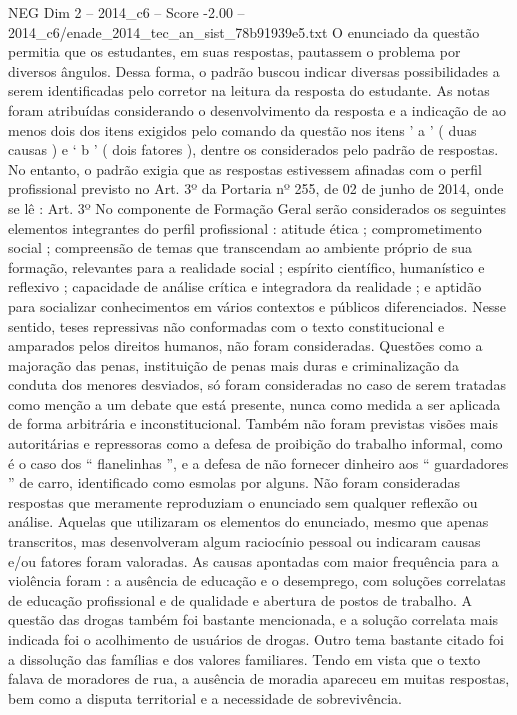 \begin{textsample}{NEG Dim 2 – 2014\_c6 – Score -2.00 – 2014\_c6/enade\_2014\_tec\_an\_sist\_78b91939e5.txt}
O enunciado da questão permitia que os estudantes, em suas respostas, pautassem o problema por diversos ângulos.
Dessa forma, o padrão buscou indicar diversas possibilidades a serem identificadas pelo corretor na leitura da resposta do estudante.
As notas foram atribuídas considerando o desenvolvimento da resposta e a indicação de ao menos dois dos itens exigidos pelo comando da questão nos itens ’ a ’ ( duas causas ) e ‘ b ’ ( dois fatores ), dentre os considerados pelo padrão de respostas.
No entanto, o padrão exigia que as respostas estivessem afinadas com o perfil profissional previsto no Art. 3º da Portaria nº 255, de 02 de junho de 2014, onde se lê : Art. 3º No componente de Formação Geral serão considerados os seguintes elementos integrantes do perfil profissional : atitude ética ; comprometimento social ; compreensão de temas que transcendam ao ambiente próprio de sua formação, relevantes para a realidade social ; espírito científico, humanístico e reflexivo ; capacidade de análise crítica e integradora da realidade ; e aptidão para socializar conhecimentos em vários contextos e públicos diferenciados.
Nesse sentido, teses repressivas não conformadas com o texto constitucional e amparados pelos direitos humanos, não foram consideradas.
Questões como a majoração das penas, instituição de penas mais duras e criminalização da conduta dos menores desviados, só foram consideradas no caso de serem tratadas como menção a um debate que está presente, nunca como medida a ser aplicada de forma arbitrária e inconstitucional.
Também não foram previstas visões mais autoritárias e repressoras como a defesa de proibição do trabalho informal, como é o caso dos “ flanelinhas ”, e a defesa de não fornecer dinheiro aos “ guardadores ” de carro, identificado como esmolas por alguns.
Não foram consideradas respostas que meramente reproduziam o enunciado sem qualquer reflexão ou análise.
Aquelas que utilizaram os elementos do enunciado, mesmo que apenas transcritos, mas desenvolveram algum raciocínio pessoal ou indicaram causas e/ou fatores foram valoradas.
As causas apontadas com maior frequência para a violência foram : a ausência de educação e o desemprego, com soluções correlatas de educação profissional e de qualidade e abertura de postos de trabalho.
A questão das drogas também foi bastante mencionada, e a solução correlata mais indicada foi o acolhimento de usuários de drogas.
Outro tema bastante citado foi a dissolução das famílias e dos valores familiares.
Tendo em vista que o texto falava de moradores de rua, a ausência de moradia apareceu em muitas respostas, bem como a disputa territorial e a necessidade de sobrevivência.

\end{textsample}
